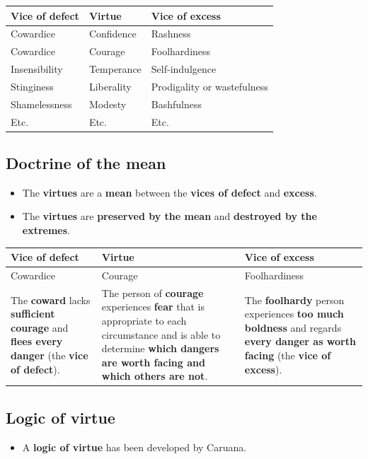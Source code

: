 \documentclass[11pt]{article}
\begin{document}
\begin{center}
\begin{tabularx}{\textwidth}{X|X|X}
Vice of defect & Virtue & Vice of excess\\
\hline
Cowardice & Confidence & Rashness\\
Cowardice & Courage & Foolhardiness\\
Insensibility & Temperance & Self-indulgence\\
Stinginess & Liberality & Prodigality or wastefulness\\
Shamelessness & Modesty & Bashfulness\\
Etc. & Etc. & Etc.\\
\end{tabularx}
\end{center}
\subsection{Doctrine of the mean}
\label{sec:org301ded0}
\begin{itemize}
\item The \textbf{virtues} are a \textbf{mean} between the \textbf{vices of defect} and \textbf{excess}.
\item The \textbf{virtues} are \textbf{preserved by the mean} and \textbf{destroyed by the extremes}.
\end{itemize}

\begin{center}
\begin{tabularx}{\textwidth}{|X|X|X|}
\hline
Vice of defect & Virtue & Vice of excess\\
\hline
Cowardice & Courage & Foolhardiness\\
\hline
The \textbf{coward} lacks \textbf{sufficient courage} and \textbf{flees every danger} (the \textbf{vice of defect}). & The person of \textbf{courage} experiences \textbf{fear} that is appropriate to each circumstance and is able to determine \textbf{which dangers are worth facing and which others are not}. & The \textbf{foolhardy} person experiences \textbf{too much boldness} and regards \textbf{every danger as worth facing} (the \textbf{vice of excess}).\\
\hline
\end{tabularx}
\end{center}

 \newpage
\subsection{Logic of virtue}
\label{sec:orgf3ea7c6}
\begin{itemize}
\item A \textbf{logic of virtue} has been developed by Caruana.
\end{itemize}
\end{document}
